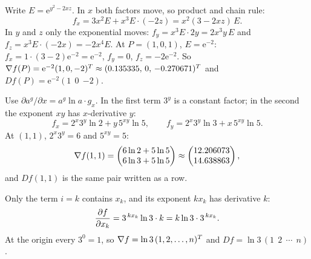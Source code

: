 \begin{solutions}
  \item Write $E=\mathrm{e}^{y^{2}-2xz}$. In $x$ both factors move, so
        product and chain rule:
        \[
          f_{x}=3x^{2}E+x^{3}E\cdot(-2z)=x^{2}(3-2xz)\,E .
        \]
        In $y$ and $z$ only the exponential moves:
        $f_{y}=x^{3}E\cdot2y=2x^{3}y\,E$ and
        $f_{z}=x^{3}E\cdot(-2x)=-2x^{4}E$. At $P=(1,0,1)$,
        $E=\mathrm{e}^{-2}$:
        $f_{x}=1\cdot(3-2)\mathrm{e}^{-2}=\mathrm{e}^{-2}$, $f_{y}=0$,
        $f_{z}=-2\mathrm{e}^{-2}$. So
        $\nabla f(P)=\mathrm{e}^{-2}(1,0,-2)^{T}\approx(0.135335,\,0,\,-0.270671)^{T}$
        and $Df(P)=\mathrm{e}^{-2}(1\ \ 0\ \ {-2})$.

  \item Use $\partial a^{g}/\partial x=a^{g}\ln a\cdot g_{x}$. In the first
        term $3^{y}$ is a constant factor; in the second the exponent $xy$
        has $x$-derivative $y$:
        \[
          f_{x}=2^{x}3^{y}\ln2+y\,5^{xy}\ln5,\qquad
          f_{y}=2^{x}3^{y}\ln3+x\,5^{xy}\ln5 .
        \]
        At $(1,1)$, $2^{x}3^{y}=6$ and $5^{xy}=5$:
        \[
          \nabla f(1,1)=\begin{pmatrix}6\ln2+5\ln5\\6\ln3+5\ln5\end{pmatrix}
          \approx\begin{pmatrix}12.206073\\14.638863\end{pmatrix},
        \]
        and $Df(1,1)$ is the same pair written as a row.

  \item Only the term $i=k$ contains $x_{k}$, and its exponent $kx_{k}$ has
        derivative $k$:
        \[
          \frac{\partial f}{\partial x_{k}}=3^{\,kx_{k}}\ln3\cdot k=k\ln3\cdot3^{\,kx_{k}} .
        \]
        At the origin every $3^{0}=1$, so
        $\nabla f=\ln3\,(1,2,\ldots,n)^{T}$ and
        $Df=\ln3\,(1\ \ 2\ \ \cdots\ \ n)$.


\end{solutions}

